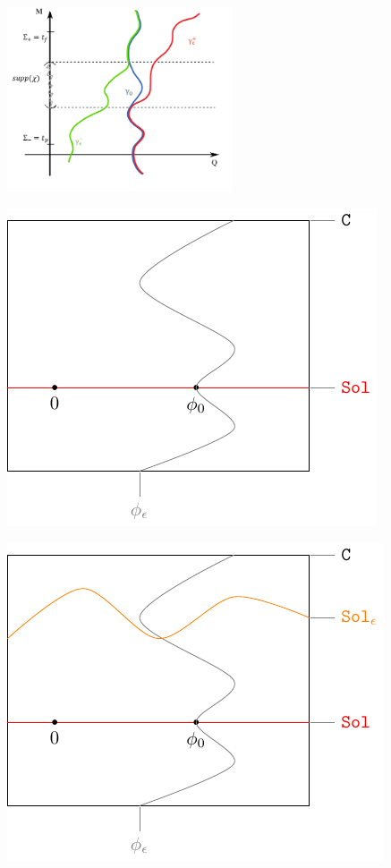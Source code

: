 \documentclass{article}
\begin{document}
	\includegraphics[width=0.5\textwidth]{../Pictures/AdvRetSol}
	
	\includegraphics[width=\textwidth]{../Pictures/GeometricPicture0}
				
	\includegraphics[width=\textwidth]{../Pictures/GeometricPicture1}
				
\end{document}
